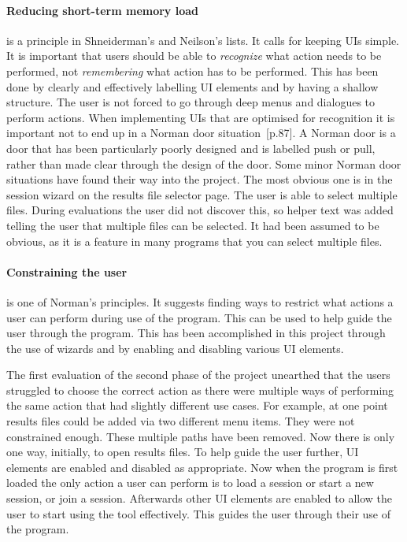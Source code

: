 \paragraph*{Reducing short-term memory load} is a principle in Shneiderman's and Neilson's lists.  It calls for keeping \acp{UI} simple.  It is important that users should be able to \textit{recognize} what action needs to be performed, not \textit{remembering} what action has to be performed.  This has been done by clearly and effectively labelling \ac{UI} elements and by having a shallow structure.  The user is not forced to go through deep menus and dialogues to perform actions.  When implementing \acp{UI} that are optimised for recognition it is important not to end up in a Norman door situation~\cite{design_of_things}[p.87].  A Norman door is a door that has been particularly poorly designed and is labelled push or pull, rather than made clear through the design of the door.  Some minor Norman door situations have found their way into the project.  The most obvious one is in the session wizard on the results file selector page.  The user is able to select multiple files.  During evaluations the user did not discover this, so helper text was added telling the user that multiple files can be selected.  It had been assumed to be obvious, as it is a feature in many programs that you can select multiple files.

\paragraph*{Constraining the user} is one of Norman's principles.  It suggests finding ways to restrict what actions a user can perform during use of the program.  This can be used to help guide the user through the program.  This has been accomplished in this project through the use of wizards and by enabling and disabling various \ac{UI} elements.

The first evaluation of the second phase of the project unearthed that the users struggled to choose the correct action as there were multiple ways of performing the same action that had slightly different use cases.  For example, at one point results files could be added via two different menu items.  They were not constrained enough.  These multiple paths have been removed. Now there is only one way, initially, to open results files.  To help guide the user further, \ac{UI} elements are enabled and disabled as appropriate.  Now when the program is first loaded the only action a user can perform is to load a session or start a new session, or join a session.  Afterwards other \ac{UI} elements are enabled to allow the user to start using the tool effectively.  This guides the user through their use of the program.

